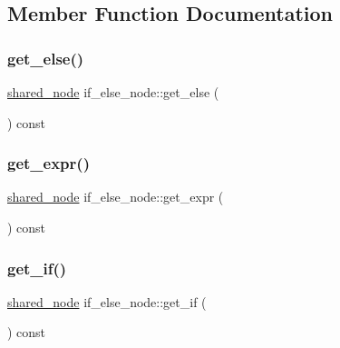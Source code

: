 \subsection{Member Function Documentation}
\mbox{\label{classjawe_1_1if__else__node_a87e1ae4d09eb009122570ec9f5b3f707}} 
\subsubsection{\texorpdfstring{get\+\_\+else()}{get\_else()}}
{\footnotesize\ttfamily \hyperlink{namespacejawe_a3f307481d921b6cbb50cc8511fc2b544}{shared\+\_\+node} if\+\_\+else\+\_\+node\+::get\+\_\+else (\begin{DoxyParamCaption}{ }\end{DoxyParamCaption}) const}

\mbox{\label{classjawe_1_1if__else__node_a8339d4fc28c66e06c5f5e94081b5427a}} 
\subsubsection{\texorpdfstring{get\+\_\+expr()}{get\_expr()}}
{\footnotesize\ttfamily \hyperlink{namespacejawe_a3f307481d921b6cbb50cc8511fc2b544}{shared\+\_\+node} if\+\_\+else\+\_\+node\+::get\+\_\+expr (\begin{DoxyParamCaption}{ }\end{DoxyParamCaption}) const}

\mbox{\label{classjawe_1_1if__else__node_aba0d6d7b1e6c3aeacbcf83ac0ccdc799}} 
\subsubsection{\texorpdfstring{get\+\_\+if()}{get\_if()}}
{\footnotesize\ttfamily \hyperlink{namespacejawe_a3f307481d921b6cbb50cc8511fc2b544}{shared\+\_\+node} if\+\_\+else\+\_\+node\+::get\+\_\+if (\begin{DoxyParamCaption}{ }\end{DoxyParamCaption}) const}



